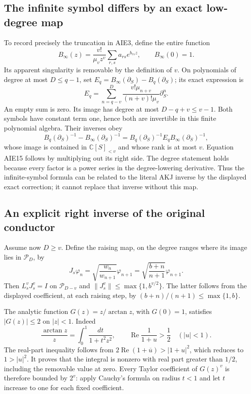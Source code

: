 \documentclass[11pt,a4paper]{article}
\begin{document}
\subsection{The infinite symbol differs by an exact low-degree map}

To record precisely the truncation in AIE3, define the entire function
\[
 B_\infty(z)=\frac{v!}{\mu_v z^v}
                 \sum_{r,s}a_{rs}e^{b_{rs}z},\qquad B_\infty(0)=1.
 \tag{AIE13}
\]
Its apparent singularity is removable by the definition of $v$.
On polynomials of degree at most $D\le q-1$, set
$E_q=B_\infty(\partial_S)-B_q(\partial_S)$; its exact expression is
\[
 E_q=\sum_{n=q-v}^{D}
       \frac{v!\mu_{n+v}}{(n+v)!\mu_v}\partial_S^n.
 \tag{AIE14}
\]
An empty sum is zero. Its image has degree at most
$D-q+v\le v-1$. Both symbols have constant term one, hence both
are invertible in this finite polynomial algebra. Their inverses obey
\[
 B_q(\partial_S)^{-1}-B_\infty(\partial_S)^{-1}
 =B_q(\partial_S)^{-1}E_qB_\infty(\partial_S)^{-1},
 \tag{AIE15}
\]
whose image is contained in $\mathbb C[S]_{<v}$ and whose rank is
at most $v$. Equation AIE15 follows by multiplying out its right
side. The degree statement holds because every factor is a power
series in the degree-lowering derivative. Thus the infinite-symbol
formula can be related to the literal AKJ inverse by the displayed
exact correction; it cannot replace that inverse without this map.

\subsection{An explicit right inverse of the original conductor}

Assume now $D\ge v$. Define the raising map, on the degree ranges
where its image lies in $\mathcal P_D$, by
\[
 J_s\varphi_n=\sqrt{\frac{w_n}{w_{n+1}}}\varphi_{n+1}
       =\sqrt{\frac{b+n}{n+1}}\varphi_{n+1}.
 \tag{AIE16}
\]
Then $L_s^vJ_s^v=I$ on $\mathcal P_{D-v}$ and
$\|J_s^v\|\le\max\{1,b^{v/2}\}$. The latter follows from
the displayed coefficient, at each raising step, by
$(b+n)/(n+1)\le\max\{1,b\}$.

The analytic function $G(z)=z/\arctan z$, with $G(0)=1$,
satisfies $|G(z)|\le2$ on $|z|<1$. Indeed
\[
 \frac{\arctan z}{z}=\int_0^1\frac{dt}{1+t^2z^2},\qquad
 \operatorname{Re}\frac1{1+u}>\frac12\quad(|u|<1).
 \tag{AIE17}
\]
The real-part inequality follows from
$2\operatorname{Re}(1+\overline u)>|1+u|^2$, which reduces
to $1>|u|^2$. It proves that the integral is nonzero with
real part greater than $1/2$, including the removable value at zero.
Every Taylor coefficient of $G(z)^v$ is therefore bounded by $2^v$:
apply Cauchy's formula on radius $t<1$ and let $t$ increase to one
for each fixed coefficient.
\end{document}
